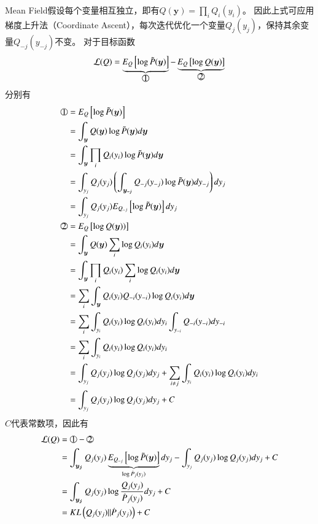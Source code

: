 Mean Field假设每个变量相互独立，即有$Q(\boldsymbol{y})=\prod_i{Q_i(y_i)}$。
因此上式可应用梯度上升法（Coordinate Ascent），每次迭代优化一个变量$Q_j(y_j)$，保持其余变量$Q_{-j}(y_{-j})$不变。
对于目标函数
\begin{equation}
	\mathcal{L}(Q)=\underbrace{E_{Q}\left[\log \tilde{P}(\boldsymbol{y})\right]}_{\tcircle{1}}-\underbrace{E_{Q}\left[\log Q(\boldsymbol{y})\right]}_{\tcircle{2}}
\end{equation}
分别有
\begin{equation}
	\begin{split}
		\tcircle{1}&=E_{Q}\left[\log \tilde{P}(\boldsymbol{y})\right]\\
		&=\int_{\boldsymbol{y}}Q(\boldsymbol{y}) \log \tilde{P}(\boldsymbol{y})d\boldsymbol{y}\\
		&=\int_{\boldsymbol{y}}\prod_i{Q_i(y_i)} \log \tilde{P}(\boldsymbol{y})d\boldsymbol{y}\\
		&=\int_{y_j}Q_j(y_j)\left(\int_{\boldsymbol{y_{-j}}}Q_{-j}(y_{-j})\log \tilde{P}(\boldsymbol{y}) dy_{-j}\right) dy_j\\
		&=\int_{y_j}Q_j(y_j)E_{Q_{-j}}\left[\log \tilde{P}(\boldsymbol{y}) \right] dy_j\\
		\tcircle{2}&=E_{Q}\left[\log Q(\boldsymbol{y}))\right]\\
		&=\int_{\boldsymbol{y}}Q(\boldsymbol{y}) \sum_i\log Q_i(y_i) d\boldsymbol{y}\\
		&=\int_{\boldsymbol{y}}\prod_i{Q_i(y_i)} \sum_i\log Q_i(y_i) d\boldsymbol{y}\\
		&=\sum_i\int_{\boldsymbol{y}}Q_i(y_i)Q_{-i}(y_{-i})\log Q_i(y_i) d\boldsymbol{y}\\
		&=\sum_i\int_{y_i}Q_i(y_i)\log Q_i(y_i) dy_i\int_{y_{-i}} {Q_{-i}(y_{-i})}dy_{-i}\\
		&=\sum_i\int_{y_i}Q_i(y_i)\log Q_i(y_i) dy_i\\
		&=\int_{y_j}Q_j(y_j)\log Q_j(y_j) dy_j + \sum_{i\neq j}\int_{y_i}Q_i(y_i)\log Q_i(y_i) dy_i  \\
		&=\int_{y_j}Q_j(y_j)\log Q_j(y_j) dy_j + C
	\end{split}
\end{equation}
$C$代表常数项，因此有
\begin{equation}
	\begin{split}
		\mathcal{L}(Q)&=\tcircle{1}-\tcircle{2}\\
		&=\int_{\boldsymbol{y_j}}Q_j(y_j)\underbrace{E_{Q_{-j}}\left[\log \tilde{P}(\boldsymbol{y}) \right]}_{\log \dot{P}_j(y_j)} dy_j-\int_{y_j}Q_j(y_j)\log Q_j(y_j) dy_j +C\\
		&=\int_{\boldsymbol{y_j}}Q_j(y_j)\log\frac{Q_j(y_j)}{\dot{P}_j(y_j)} dy_j +C\\
		&=KL\left(Q_j(y_j)\|\dot{P}_j(y_j)\right)+C
	\end{split}
\end{equation}
